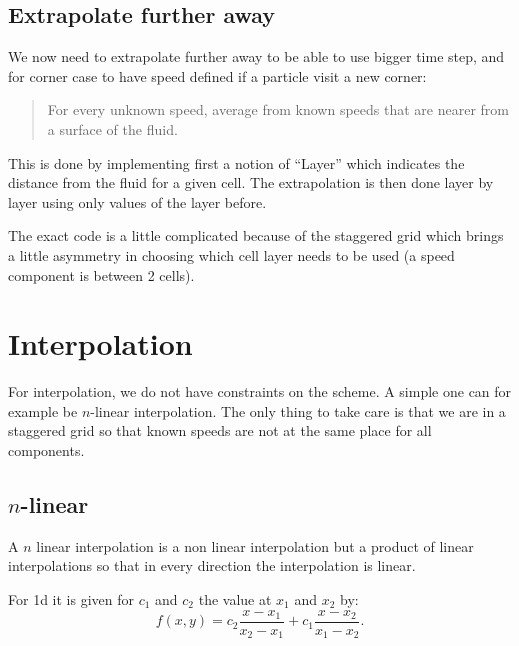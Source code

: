 \subsection{Extrapolate further away}

We now need to extrapolate further away to be able to use bigger time step,
and for corner case to have speed defined if a particle visit a new corner:
\begin{quote}
For every unknown speed, average from known speeds that are nearer from a surface of the fluid.
\end{quote}
This is done by implementing first a notion of ``Layer'' which indicates the distance from the fluid for a given cell.
The extrapolation is then done layer by layer using only values of the layer before.

The exact code is a little complicated because of the staggered grid which brings a little asymmetry in choosing which cell layer needs to be used
(a speed component is between 2 cells).


\section{Interpolation}

For interpolation, we do not have constraints on the scheme. A simple one can for example be $n$-linear interpolation.
The only thing to take care is that we are in a staggered grid so that known speeds are not at the same place
for all components.

\subsection{$n$-linear}

A $n$ linear interpolation is a non linear interpolation but a product of linear interpolations so that in every direction the interpolation is linear.

For 1d it is given for $c_1$ and $c_2$ the value at $x_1$ and $x_2$ by:
\begin{equation}
	f(x,y)=c_2\frac{x-x_{1}}{x_{2}-x_{1}}+c_1\frac{x-x_{2}}{x_{1}-x_{2}}.
\end{equation}


